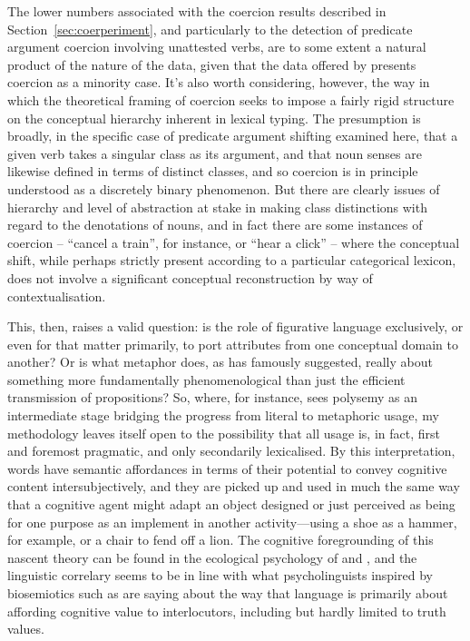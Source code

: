 The lower numbers associated with the coercion results described in Section~\ref{sec:coerperiment}, and particularly to the detection of predicate argument coercion involving unattested verbs, are to some extent a natural product of the nature of the data, given that the data offered by \cite{PustejovskyEA2010} presents coercion as a minority case.  It's also worth considering, however, the way in which the theoretical framing of coercion seeks to impose a fairly rigid structure on the conceptual hierarchy inherent in lexical typing.  The presumption is broadly, in the specific case of predicate argument shifting examined here, that a given verb takes a singular class as its argument, and that noun senses are likewise defined in terms of distinct classes, and so coercion is in principle understood as a discretely binary phenomenon.  But there are clearly issues of hierarchy and level of abstraction at stake in making class distinctions with regard to the denotations of nouns, and in fact there are some instances of coercion -- ``cancel a train'', for instance, or ``hear a click'' -- where the conceptual shift, while perhaps strictly present according to a particular categorical lexicon, does not involve a significant conceptual reconstruction by way of contextualisation.

This, then, raises a valid question: is the role of figurative language exclusively, or even for that matter primarily, to port attributes from one conceptual domain to another?  Or is what metaphor does, as \cite{Davidson1978} has famously suggested, really about something more fundamentally phenomenological than just the efficient transmission of propositions?  So, where, for instance, \cite{Sweetser1990} sees polysemy as an intermediate stage bridging the progress from literal to metaphoric usage, my methodology leaves itself open to the possibility that all usage is, in fact, first and foremost pragmatic, and only secondarily lexicalised.  By this interpretation, words have semantic affordances in terms of their potential to convey cognitive content intersubjectively, and they are picked up and used in much the same way that a cognitive agent might adapt an object designed or just perceived as being for one purpose as an implement in another activity---using a shoe as a hammer, for example, or a chair to fend off a lion.  The cognitive foregrounding of this nascent theory can be found in the ecological psychology of \cite{Bateson1972} and \cite{Gibson1979}, and the linguistic correlary seems to be in line with what psycholinguists inspired by biosemiotics such as \cite{RaczasekLeonardiEA2015} are saying about the way that language is primarily about affording cognitive value to interlocutors, including but hardly limited to truth values.

